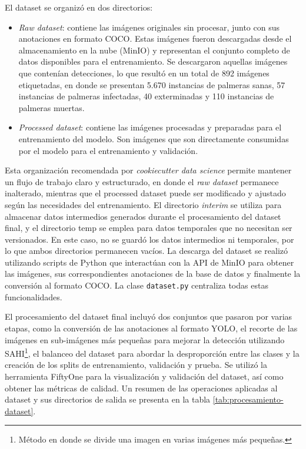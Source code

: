 El dataset se organizó en dos directorios:
\begin{itemize}
    \item \textit{Raw dataset}: contiene las imágenes originales sin procesar, junto con sus anotaciones en formato COCO. Estas imágenes fueron descargadas desde el almacenamiento en la nube (MinIO) y representan el conjunto completo de datos disponibles para el entrenamiento. Se descargaron aquellas imágenes que contenían detecciones, lo que resultó en un total de 892 imágenes etiquetadas, en donde se presentan 5.670 instancias de palmeras sanas, 57 instancias de palmeras infectadas, 40 exterminadas y 110 instancias de palmeras muertas.
    \item \textit{Processed dataset}: contiene las imágenes procesadas y preparadas para el entrenamiento del modelo. Son imágenes que son directamente consumidas por el modelo para el entrenamiento y validación.
\end{itemize}

Esta organización recomendada por \textit{cookiecutter data science} permite mantener un flujo de trabajo claro y estructurado, en donde el \textit{raw dataset} permanece inalterado, mientras que el processed dataset puede ser modificado y ajustado según las necesidades del entrenamiento. El directorio \textit{interim} se utiliza para almacenar datos intermedios generados durante el procesamiento del dataset final, y el directorio temp se emplea para datos temporales que no necesitan ser versionados. En este caso, no se guardó los datos intermedios ni temporales, por lo que ambos directorios permanecen vacíos. La descarga del dataset se realizó utilizando scripts de Python que interactúan con la API de MinIO para obtener las imágenes, sus correspondientes anotaciones de la base de datos y finalmente la conversión al formato COCO. La clase \lstinline[language=sh]|dataset.py| centraliza todas estas funcionalidades.

El procesamiento del dataset final incluyó dos conjuntos que pasaron por varias etapas, como la conversión de las anotaciones al formato YOLO, el recorte de las imágenes en sub-imágenes más pequeñas para mejorar la detección utilizando SAHI\footnote{Método en donde se divide una imagen en varias imágenes más pequeñas.}, el balanceo del dataset para abordar la desproporción entre las clases y la creación de los splits de entrenamiento, validación y prueba. Se utilizó la herramienta FiftyOne para la visualización y validación del dataset, así como obtener las métricas de calidad. Un resumen de las operaciones aplicadas al dataset y sus directorios de salida se presenta en la tabla \ref{tab:procesamiento-dataset}.

